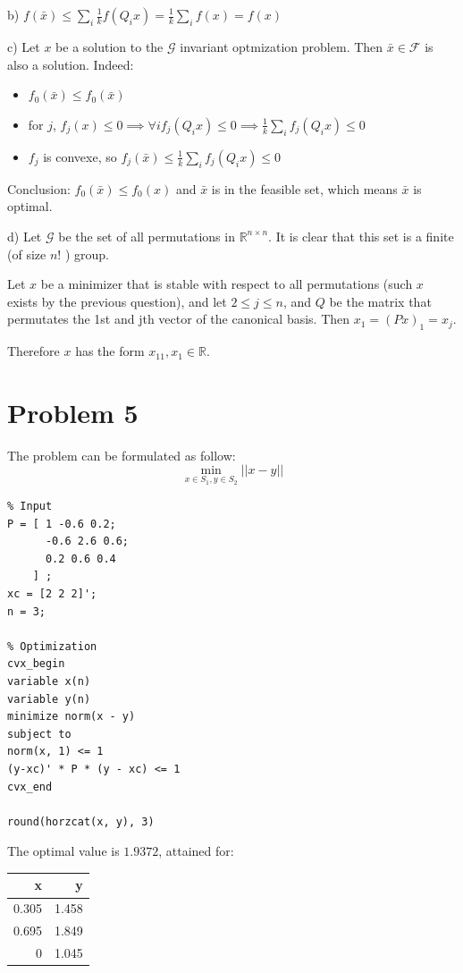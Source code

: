 \documentclass[11pt]{article}
\begin{document}
b) \(f(\bar x) \le \sum_i \frac1k f(Q_ix) = \frac1k \sum_i  f(x) = f(x)\)

c) Let \(x\) be a solution to the \(\mathcal{G}\) invariant optmization problem. Then \(\bar x \in \mathcal F\) is also a solution. Indeed:

\begin{itemize}
\item \(f_0(\bar x) \le f_0(\bar x)\)
\item for \(j\), \(f_j(x) \le 0 \implies \forall i f_j(Q_i x) \le 0 \implies  \frac1k \sum_i f_j(Q_i x) \le 0\)
\item \(f_j\) is convexe, so \(f_j(\bar x)  \le \frac1k \sum_i f_j(Q_i x) \le 0\)
\end{itemize}

Conclusion: \(f_0(\bar x) \le f_0(x)\) and \(\bar x\) is in the feasible set, which means \(\bar x\) is optimal.

d) Let \(\mathcal G\) be the set of all permutations in \(\mathbb R^{n \times n}\). It is clear that this set is a finite (of size \(n!\) ) group.

Let \(x\) be a minimizer that is stable with respect to all permutations (such \(x\) exists by the previous question), and let \(2 \le j \le n\), and \(Q\) be the matrix that permutates the 1st and jth vector of the canonical basis.
Then \(x_1 = (Px)_1 = x_j\).

Therefore \(x\)  has the form \(x_11, x_1 \in \mathbb R\).


\section{Problem 5}
\label{sec:orgheadline6}

The problem can be formulated as follow:
$$\min_{x \in S_1, y \in S_2} ||x - y||$$

\begin{verbatim}
% Input
P = [ 1 -0.6 0.2; 
      -0.6 2.6 0.6;
      0.2 0.6 0.4
    ] ;
xc = [2 2 2]';
n = 3;

% Optimization
cvx_begin
variable x(n)
variable y(n)
minimize norm(x - y)
subject to
norm(x, 1) <= 1
(y-xc)' * P * (y - xc) <= 1
cvx_end

round(horzcat(x, y), 3)
\end{verbatim}



The optimal value is \(1.9372\), attained for:

\begin{center}
\begin{tabular}{rr}
x & y\\
\hline
0.305 & 1.458\\
0.695 & 1.849\\
0 & 1.045\\
\end{tabular}
\end{center}
\end{document}
